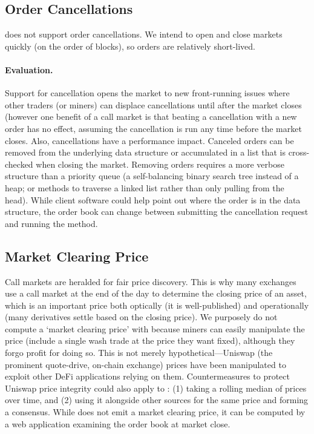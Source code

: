 \subsection{Order Cancellations}

\cm does not support order cancellations. We intend to open and close markets quickly (on the order of blocks), so orders are relatively short-lived. 

\paragraph{Evaluation.} Support for cancellation opens the market to new front-running issues where other traders (or miners) can displace cancellations until after the market closes (however one benefit of a call market is that beating a cancellation with a new order has no effect, assuming the cancellation is run any time before the market closes. Also, cancellations have a performance impact. Canceled orders can be removed from the underlying data structure or accumulated in a list that is cross-checked when closing the market. Removing orders requires a more verbose structure than a priority queue (\eg a self-balancing binary search tree instead of a heap; or methods to traverse a linked list rather than only pulling from the head). While client software could help point out where the order is in the data structure, the order book can change between submitting the cancellation request and running the method. %


\subsection{Market Clearing Price}

Call markets are heralded for fair price discovery. This is why many exchanges use a call market at the end of the day to determine the closing price of an asset, which is an important price both optically (it is well-published) and operationally (many derivatives settle based on the closing price). We purposely do not compute a `market clearing price' with \cm because miners can easily manipulate the price (\ie include a single wash trade at the price they want fixed), although they forgo profit for doing so. This is not merely hypothetical---Uniswap (the prominent quote-drive, on-chain exchange) prices have been manipulated to exploit other DeFi applications relying on them. Countermeasures to protect Uniswap price integrity could also apply to \cm: (1) taking a rolling median of prices over time, and (2) using it alongside other sources for the same price and forming a consensus. While \cm does not emit a market clearing price, it can be computed by a web application examining the order book at market close. 

